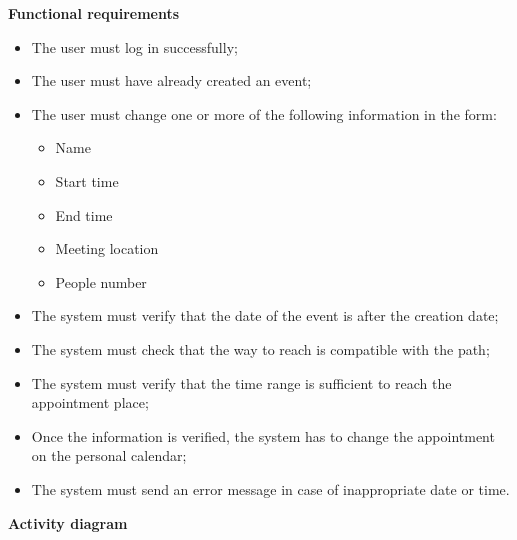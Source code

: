 \documentclass{article}
\begin{document}
	\newpage
	\noindent
	\textbf{Functional requirements} \\
	\begin{itemize}
		\item The user must log in successfully;
		\item The user must have already created an event;
		\item The user must change one or more of the following information in the form:
			\begin{itemize}
				\item Name
				\item Start time
				\item End time
				\item Meeting location
				\item People number
			\end{itemize}
		\item The system must verify that the date of the event is after the creation date;
		\item The system must check that the way to reach is compatible with the path;
		\item The system must verify that the time range is sufficient to reach the appointment place;
		\item Once the information is verified, the system has to change the appointment on the personal calendar;
		\item The system must send an error message in case of inappropriate date or time.
	\end{itemize}
	
	\newpage
	\noindent
	\textbf{Activity diagram} \\
	
\end{document}
